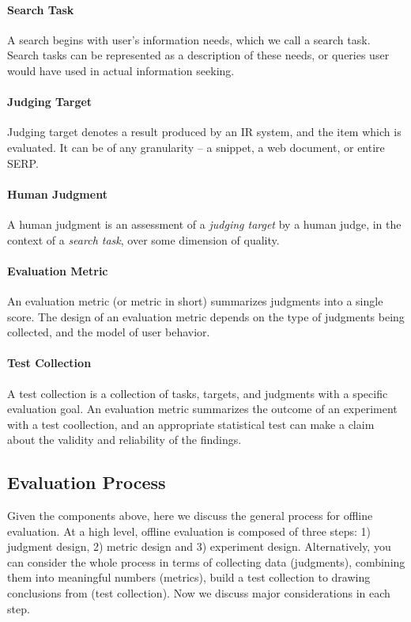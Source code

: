 \paragraph{Search Task} A search begins with user's information needs, which we call a search task. Search tasks can be represented as a description of these needs, or queries user would have used in actual information seeking.

\paragraph{Judging Target} Judging target denotes a result produced by an IR system, and the item which is evaluated. It can be of any granularity -- a snippet, a web document, or entire SERP. 

\paragraph{Human Judgment} A human judgment is an assessment of a \textit{judging target} by a human judge, in the context of a \textit{search task}, over some dimension of quality. 

\paragraph{Evaluation Metric} An evaluation metric (or metric in short) summarizes judgments into a single score. The design of an evaluation metric depends on the type of judgments being collected, and the model of user behavior.

\paragraph{Test Collection} A test collection is a collection of tasks, targets, and judgments with a specific evaluation goal. An evaluation metric summarizes the outcome of an experiment with a test coollection, and an appropriate statistical test can make a claim about the validity and reliability of the findings.

\subsection{Evaluation Process}
Given the components above, here we discuss the general process for offline evaluation. At a high level, offline evaluation is composed of three steps: 1) judgment design, 2) metric design and 3) experiment design. Alternatively, you can consider the whole process in terms of collecting data (judgments), combining them into meaningful numbers (metrics), build a test collection to drawing conclusions from (test collection). Now we discuss major considerations in each step.

